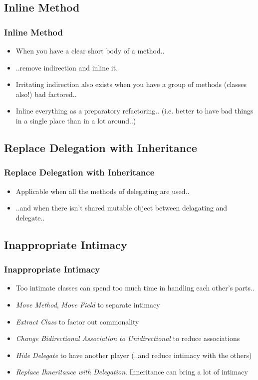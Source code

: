 \documentclass{beamer}
\begin{document}
\subsection{Inline Method}
\begin{frame}
  \frametitle{Inline Method}
  \begin{itemize}
	\item<+-> When you have a clear short body of a method.. 
	\item<+-> ..remove indirection and inline it.
	\item<+-> Irritating indirection also exists when you have a group of methods (classes also!) bad factored..
	\item<+-> Inline everything as a preparatory refactoring.. (i.e. better to have bad things in a single place than in a lot around..)
   \end{itemize}
\end{frame}

\subsection{Replace Delegation with Inheritance}
\begin{frame}
  \frametitle{Replace Delegation with Inheritance}
  \begin{itemize}
	\item<+-> Applicable when all the methods of delegating are used..
	\item<+-> ..and when there isn't shared mutable object between delagating and delegate..
   \end{itemize}
\end{frame}

\subsection{Inappropriate Intimacy}
\begin{frame}
  \frametitle{Inappropriate Intimacy}
  \begin{itemize}
	\item<+-> Too intimate classes can spend too much time in handling each other's parts..
	\item<+-> \textit{Move Method}, \textit{Move Field} to separate intimacy
	\item<+-> \textit{Extract Class} to factor out commonality
	\item<+-> \textit{Change Bidirectional Association to Unidirectional} to reduce associations
	\item<+-> \textit{Hide Delegate} to have another player (..and reduce intimacy with the others)
	\item<+-> \textit{Replace Ihneritance with Delegation}. Ihneritance can bring a lot of intimacy 
   \end{itemize}
\end{frame}
\end{document}
